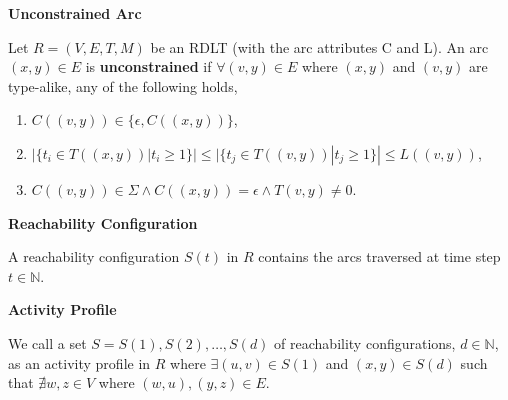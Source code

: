 \documentclass[12pt]{article}
\begin{document}
        \begin{definition} \textbf{Unconstrained Arc} \cite{malinao-rdlt}

        Let $R = (V,E,T,M)$ be an RDLT (with the arc attributes C and L). An arc $(x,y) \in E$ is \textbf{unconstrained} if $\forall (v,y) \in E$ where $(x,y)$ and $(v,y)$ are type-alike, any of the following holds,

            \begin{enumerate}
                
                \item $C((v,y)) \in \{\epsilon,C((x,y))\}$,

                \item $|\{t_{i} \in T((x,y))|t_{i} \geq 1\}|\leq |\{t_{j} \in T((v,y))|t_{j} \geq 1\}| \leq L((v,y))$,

                \item $C((v,y)) \in \Sigma \wedge C((x,y)) = \epsilon \wedge T(v,y) \neq 0$.
                
            \end{enumerate}
            
        \end{definition}

        \begin{definition} \textbf{Reachability Configuration} \cite{malinao-rdlt}

        A reachability configuration $S(t)$ in $R$ contains the arcs traversed at time step $t \in \mathbb{N}$.
            
        \end{definition}

        \begin{definition} \textbf{Activity Profile} \cite{malinao-rdlt}

        We call a set $S = S(1), S(2), \ldots, S(d)$ of reachability configurations, $d \in \mathbb{N}$, as an activity profile in $R$ where $\exists(u,v) \in S(1)$ and $(x,y) \in S(d)$ such that $ \nexists w,z \in V$ where $(w,u),(y,z) \in E$.
            
        \end{definition}
\end{document}
